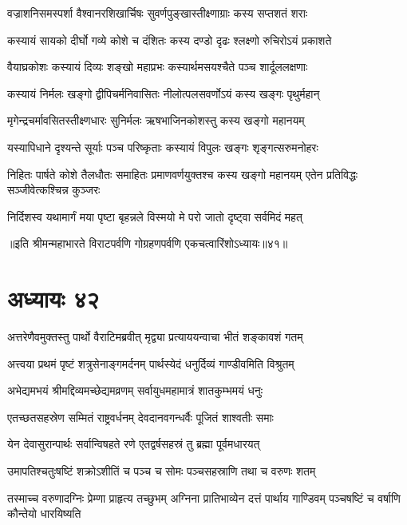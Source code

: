 \twolineshloka
{वज्राशनिसमस्पर्शा वैश्वानरशिखार्चिषः}
{सुवर्णपुङ्खास्तीक्ष्णाग्राः कस्य सप्तशतं शराः}


\twolineshloka
{कस्यायं सायको दीर्घो गव्ये कोशे च दंशितः}
{कस्य दण्डो दृढः श्लक्ष्णो रुचिरोऽयं प्रकाशते}


\twolineshloka
{वैयाघ्रकोशः कस्यायं दिव्यः शङ्खो महाप्रभः}
{कस्यार्थमसयश्चैते पञ्च शार्दूललक्षणाः}


\twolineshloka
{कस्यायं निर्मलः खङ्गो द्वीपिचर्मनिवासितः}
{नीलोत्पलसवर्णोऽयं कस्य खङ्गः पृथुर्महान्}


\twolineshloka
{मृगेन्द्रचर्मावसितस्तीक्ष्णधारः सुनिर्मलः}
{ऋषभाजिनकोशस्तु कस्य खङ्गो महानयम्}


\twolineshloka
{यस्यापिधाने दृश्यन्ते सूर्याः पञ्च परिष्कृताः}
{कस्यायं विपुलः खङ्गः शृङ्गत्सरुमनोहरः}


\threelineshloka
{निहितः पार्षते कोशे तैलधौतः समाहितः}
{प्रमाणवर्णयुक्तश्च कस्य खङ्गो महानयम्}
{एतेन प्रतिविद्धः सञ्जीवेत्कश्चिन्न कुञ्जरः}


\twolineshloka
{निर्दिशस्व यथामार्गं मया पृष्टा बृहन्नले}
{विस्मयो मे परो जातो दृष्ट्वा सर्वमिदं महत्}

॥इति श्रीमन्महाभारते विराटपर्वणि गोग्रहणपर्वणि एकचत्वारिंशोऽध्यायः॥४१॥

\chapter{अध्यायः ४२}

\twolineshloka
{अत्तरेणैवमुक्तस्तु पार्थो वैराटिमब्रवीत्}
{मृद्व्या प्रत्याययन्वाचा भीतं शङ्कावशं गतम्}




\twolineshloka
{अत्त्वया प्रथमं पृष्टं शत्रुसेनाङ्गमर्दनम्}
{पार्थस्येदं धनुर्दिव्यं गाण्डीवमिति विश्रुतम्}


\twolineshloka
{अभेद्यमभयं श्रीमद्दिव्यमच्छेद्यमव्रणम्}
{सर्वायुधमहामात्रं शातकुम्भमयं धनुः}


\twolineshloka
{एतच्छतसहस्रेण सम्मितं राष्ट्रवर्धनम्}
{देवदानवगन्धर्वैः पूजितं शाश्वतीः समाः}


\twolineshloka
{येन देवासुरान्पार्थः सर्वान्विषहते रणे}
{एतद्वर्षसहस्रं तु ब्रह्मा पूर्वमधारयत्}


\twolineshloka
{उमापतिश्चतुःषष्टिं शक्रोऽशीतिं च पञ्च च}
{सोमः पञ्चसहस्राणि तथा च वरुणः शतम्}


\threelineshloka
{तस्माच्च वरुणादग्निः प्रेम्णा प्राहृत्य तच्छुभम्}
{अग्निना प्रातिभाव्येन दत्तं पार्थाय गाण्डिवम्}
{पञ्चषष्टिं च वर्षाणि कौन्तेयो धारयिष्यति}


